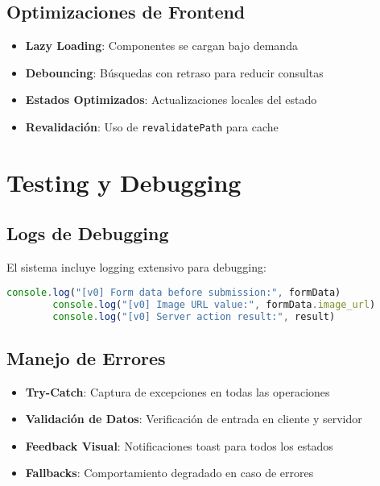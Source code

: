 \documentclass[12pt,a4paper]{article}
\begin{document}
	\subsection{Optimizaciones de Frontend}
	
	\begin{itemize}
		\item \textbf{Lazy Loading}: Componentes se cargan bajo demanda
		\item \textbf{Debouncing}: Búsquedas con retraso para reducir consultas
		\item \textbf{Estados Optimizados}: Actualizaciones locales del estado
		\item \textbf{Revalidación}: Uso de \texttt{revalidatePath} para cache
	\end{itemize}
	
	\section{Testing y Debugging}
	
	\subsection{Logs de Debugging}
	
	El sistema incluye logging extensivo para debugging:
	
	\begin{lstlisting}[language=JavaScript, caption=Ejemplo de logging]
		console.log("[v0] Form data before submission:", formData)
		console.log("[v0] Image URL value:", formData.image_url)
		console.log("[v0] Server action result:", result)
	\end{lstlisting}
	
	\subsection{Manejo de Errores}
	
	\begin{itemize}
		\item \textbf{Try-Catch}: Captura de excepciones en todas las operaciones
		\item \textbf{Validación de Datos}: Verificación de entrada en cliente y servidor
		\item \textbf{Feedback Visual}: Notificaciones toast para todos los estados
		\item \textbf{Fallbacks}: Comportamiento degradado en caso de errores
	\end{itemize}
	
\end{document}
